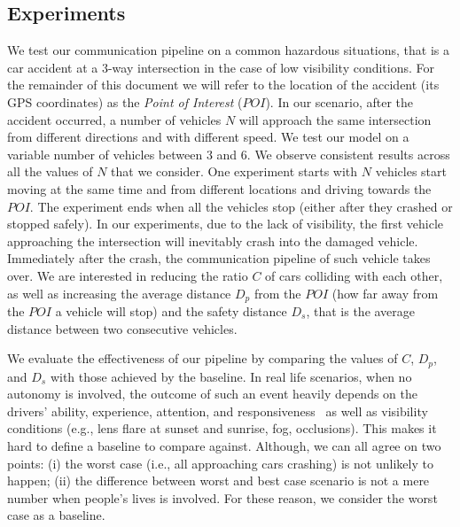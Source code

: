 \subsection{Experiments}
We test our communication pipeline on a common hazardous situations, that is a car accident at a 3-way 
intersection in the case of low visibility conditions. For the remainder of this document we will refer to the location of
the accident (its GPS coordinates) as the \textit{Point of Interest} ($POI$). 
In our scenario, after the accident occurred, a number of 
vehicles $N$ will approach the same intersection from different directions and with different speed.
We test our model on a variable number of vehicles between $3$ and $6$. We observe consistent 
results across all the values of $N$ that we consider.
One experiment starts with $N$ vehicles start moving at the same time and from different locations and
driving towards the $POI$. The experiment ends when all the vehicles stop (either after they crashed
or stopped safely).
In our experiments, due to the lack of visibility, the first vehicle approaching the intersection will inevitably crash 
into the damaged vehicle. Immediately after the crash, the communication pipeline of such vehicle takes over.
We are interested in reducing the ratio $C$ of cars colliding with each other, as well as increasing 
the average distance $D_p$ from the $POI$ (how far away from the $POI$ a vehicle will stop) and the safety 
distance $D_s$, that is the average distance between two consecutive vehicles.

We evaluate the effectiveness of our pipeline by comparing the values of $C$, $D_p$, and $D_s$ 
with those achieved by the baseline.
In real life scenarios, when no autonomy is involved, 
the outcome of such an event heavily depends on the drivers' ability, experience, attention, and 
responsiveness~\cite{eby1995analysis} as well as visibility conditions (e.g., lens flare at sunset and 
sunrise, fog, occlusions). This makes it hard to define
a baseline to compare against. Although, we can all agree on two points: (i) the worst case (i.e., all approaching 
cars crashing) is not unlikely to happen; (ii) the difference between worst and best case scenario is not a mere 
number when people's lives is involved. For these reason, we consider the worst case as a baseline.


